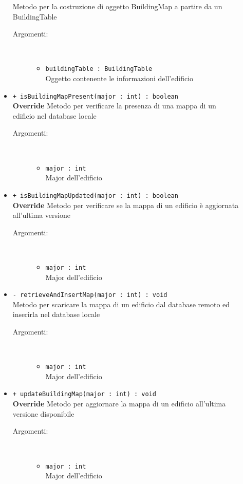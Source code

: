 \documentclass[../DefinizioneDiProdotto.tex]{subfiles}
\begin{document}
\begin{description}
\begin{itemize}
Metodo per la costruzione di oggetto BuildingMap a partire da un BuildingTable
 \begin{description}
\item[Argomenti:] \
\begin{itemize}
\item \texttt{buildingTable : BuildingTable}\\
Oggetto contenente le informazioni dell'edificio\end{itemize}
\end{description}
\item \texttt{+ isBuildingMapPresent(major : int) : boolean}\\
\textbf{Override} Metodo per verificare la presenza di una mappa di un edificio nel database locale
 \begin{description}
\item[Argomenti:] \
\begin{itemize}
\item \texttt{major : int}\\
Major dell'edificio\end{itemize}
\end{description}
\item \texttt{+ isBuildingMapUpdated(major : int) : boolean}\\
\textbf{Override} Metodo per verificare se la mappa di un edificio è aggiornata all'ultima versione
 \begin{description}
\item[Argomenti:] \
\begin{itemize}
\item \texttt{major : int}\\
Major dell'edificio\end{itemize}
\end{description}
\item \texttt{- retrieveAndInsertMap(major : int) : void}\\
Metodo per scaricare la mappa di un edificio dal database remoto ed inserirla nel database locale
 \begin{description}
\item[Argomenti:] \
\begin{itemize}
\item \texttt{major : int}\\
Major dell'edificio\end{itemize}
\end{description}
\item \texttt{+ updateBuildingMap(major : int) : void}\\
\textbf{Override} Metodo per aggiornare la mappa di un edificio all'ultima versione disponibile
 \begin{description}
\item[Argomenti:] \
\begin{itemize}
\item \texttt{major : int}\\
Major dell'edificio\end{itemize}
\end{description}
\end{itemize}
\end{description}
\end{document}
